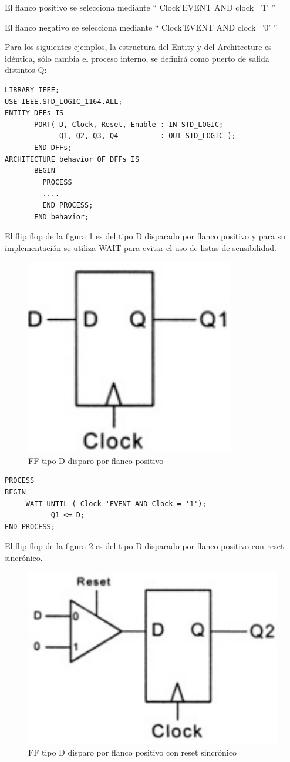 El flanco positivo se selecciona mediante `` Clock’EVENT AND clock=’1’ ''

El flanco negativo se selecciona mediante `` Clock’EVENT AND clock=’0’ ''

Para los siguientes ejemplos, la estructura del Entity y del Architecture es idéntica, sólo cambia 
el proceso interno, se definirá como puerto de salida distintos Q:

\begin{lstlisting}[style=vhdl, basicstyle=\footnotesize\ttfamily]
LIBRARY IEEE;
USE IEEE.STD_LOGIC_1164.ALL;
ENTITY DFFs IS
       PORT( D, Clock, Reset, Enable : IN STD_LOGIC;
             Q1, Q2, Q3, Q4          : OUT STD_LOGIC );
       END DFFs;
ARCHITECTURE behavior OF DFFs IS
       BEGIN 
         PROCESS
         ....
         END PROCESS;
       END behavior;
\end{lstlisting}

El flip flop de la figura \ref{ff1} es del tipo D disparado por flanco positivo
y para su implementación se utiliza WAIT para evitar el uso de listas de sensibilidad.

\begin{figure}[h!]
  \centering
    \includegraphics[width=.3\textwidth]{graficos/ff1.png}
  \caption{FF tipo D disparo por flanco positivo}
  \label{ff1}
\end{figure}

\begin{lstlisting}[style=vhdl, basicstyle=\footnotesize\ttfamily]
PROCESS
BEGIN
     WAIT UNTIL ( Clock 'EVENT AND Clock = '1');
           Q1 <= D;
END PROCESS;

\end{lstlisting}


El flip flop de la figura \ref{ff2} es del tipo D disparado por flanco positivo
con reset sincrónico.
\begin{figure}[h!]
  \centering
    \includegraphics[width=.4\textwidth]{graficos/ff2.png}
  \caption{FF tipo D disparo por flanco positivo con reset sincrónico}
  \label{ff2}
\end{figure}

